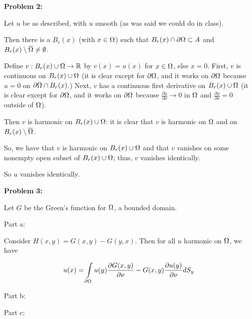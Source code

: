 \documentclass[a4paper,12pt]{article}
\begin{document}
{\bf Problem 2:}

Let $u$ be as described, with $u$ smooth (as was said we could do in class). %

Then there is a $B_r(x)$ (with $x \in \Omega$) such that $B_r(x) \cap \partial \Omega \subset A$ and $B_r(x) \setminus \overline{\Omega} \neq \emptyset$.

Define $v: B_r(x) \cup \Omega \to \mathbb{R}$ by $v(x) = u(x)$ for $x \in \Omega$, else $x = 0$. First, $v$ is continuous on $B_r(x) \cup \Omega$ (it is clear except for $\partial \Omega$, and it works on $\partial \Omega$ because $u = 0$ on $\partial \Omega \cap B_r(x)$.) Next, $v$ has a continuous first derivative on $B_r(x) \cup \Omega$ (it is clear except for $\partial \Omega$, and it works on $\partial \Omega$ because $\frac{\partial u}{\partial \nu} \to 0$ in $\Omega$ and $\frac{\partial u}{\partial \nu} = 0$ outside of $\Omega$).

Then $v$ is harmonic on $B_r(x) \cup \Omega$: it is clear that $v$ is harmonic on $\Omega$ and on $B_r(x) \setminus \overline{\Omega}$. %

So, we have that $v$ is harmonic on $B_r(x) \cup \Omega$ and that $v$ vanishes on some nonempty open subset of $B_r(x) \cup \Omega$; thus, $v$ vanishes identically.

So $u$ vanishes identically. 

\shunt

{\bf Problem 3:}


Let $G$ be the Green's function for $\Omega$, a bounded domain.

Part a:

Consider $H(x,y) = G(x,y) - G(y,x)$. Then for all $u$ harmonic on $\Omega$, we have

\begin{align*}
u(x) &= \int\limits_{\partial \Omega} u(y) \frac{\partial G(x,y)}{\partial \nu} - G(x,y) \frac{\partial u(y)}{\partial \nu} dS_y\\
\end{align*}


\shunt

Part b:



\shunt

Part c:


\shunt
\end{document}
